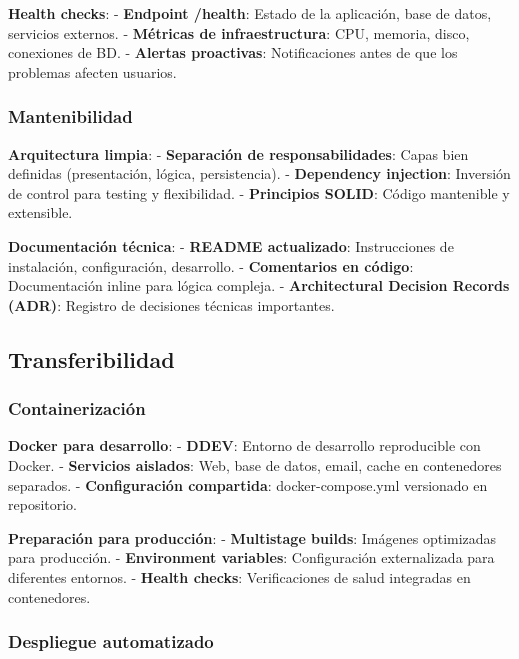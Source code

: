 \documentclass[12pt,a4paper,oneside]{report}
\begin{document}
\textbf{Health checks}: - \textbf{Endpoint /health}: Estado de la
aplicación, base de datos, servicios externos. - \textbf{Métricas de
infraestructura}: CPU, memoria, disco, conexiones de BD. -
\textbf{Alertas proactivas}: Notificaciones antes de que los problemas
afecten usuarios.

\subsubsection{Mantenibilidad}\label{mantenibilidad}

\textbf{Arquitectura limpia}: - \textbf{Separación de
responsabilidades}: Capas bien definidas (presentación, lógica,
persistencia). - \textbf{Dependency injection}: Inversión de control
para testing y flexibilidad. - \textbf{Principios SOLID}: Código
mantenible y extensible.

\textbf{Documentación técnica}: - \textbf{README actualizado}:
Instrucciones de instalación, configuración, desarrollo. -
\textbf{Comentarios en código}: Documentación inline para lógica
compleja. - \textbf{Architectural Decision Records (ADR)}: Registro de
decisiones técnicas importantes.

\subsection{Transferibilidad}\label{transferibilidad}

\subsubsection{Containerización}\label{containerizaciuxf3n}

\textbf{Docker para desarrollo}: - \textbf{DDEV}: Entorno de desarrollo
reproducible con Docker. - \textbf{Servicios aislados}: Web, base de
datos, email, cache en contenedores separados. - \textbf{Configuración
compartida}: docker-compose.yml versionado en repositorio.

\textbf{Preparación para producción}: - \textbf{Multistage builds}:
Imágenes optimizadas para producción. - \textbf{Environment variables}:
Configuración externalizada para diferentes entornos. - \textbf{Health
checks}: Verificaciones de salud integradas en contenedores.

\subsubsection{Despliegue automatizado}\label{despliegue-automatizado}
\end{document}
